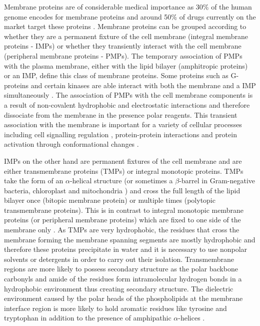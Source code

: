 Membrane proteins are of considerable medical importance as 30\% of the human genome encodes for membrane proteins \cite{mesdaghi2020silico} and around 50\% of drugs currently on the market target these proteins \cite{overington2006many}.  Membrane proteins can be grouped according to whether they are a permanent fixture of the cell membrane (integral membrane proteins - IMPs) or whether they transiently interact with the cell membrane (peripheral membrane proteins - PMPs).  The temporary association of PMPs with the plasma membrane, either with the lipid bilayer (amphitropic proteins) or an IMP, define this class of membrane proteins. Some proteins such as G-proteins and certain kinases are able interact with both the membrane and a IMP simultaneously \cite{vogler2008membrane}. The association of PMPs with the cell membrane components is a result of non-covalent hydrophobic and electrostatic interactions and therefore dissociate from the membrane in the presence polar reagents.  This transient association with the membrane is important for a variety of cellular processes including cell signalling regulation \cite{cafiso2005structure}, protein-protein interactions \cite{takida2004exocytic} and protein activation through conformational changes \cite{johnson1999amphitropic}.

IMPs on the other hand are permanent fixtures of the cell membrane and are either transmembrane proteins (TMPs) or integral monotopic proteins. TMPs take the form of an $\alpha$-helical structure (or sometimes a $\beta$-barrel in Gram-negative bacteria, chloroplast and mitochondria \cite{selkrig2014assembly}) and cross the full length of the lipid bilayer once (bitopic membrane protein) or multiple times (polytopic transmembrane proteins).  This is in contrast to integral monotopic membrane proteins (or peripheral membrane proteins) which are fixed to one side of the membrane only \cite{baker2017charged}.  As TMPs are very hydrophobic, the residues that cross the membrane forming the membrane spanning segments are mostly hydrophobic and therefore these proteins precipitate in water and it is necessary to use nonpolar solvents or detergents in order to carry out their isolation. Transmembrane regions are more likely to possess secondary structure as the polar backbone carbonyls and amide of the residues form intramolecular hydrogen bonds in a hydrophobic environment thus creating secondary structure. The dielectric environment caused by the polar heads of the phospholipids at the membrane interface region is more likely to hold aromatic residues like tyrosine and tryptophan in addition to the presence of amphipathic $\alpha$-helices \cite{wimley1996solvation}.  

